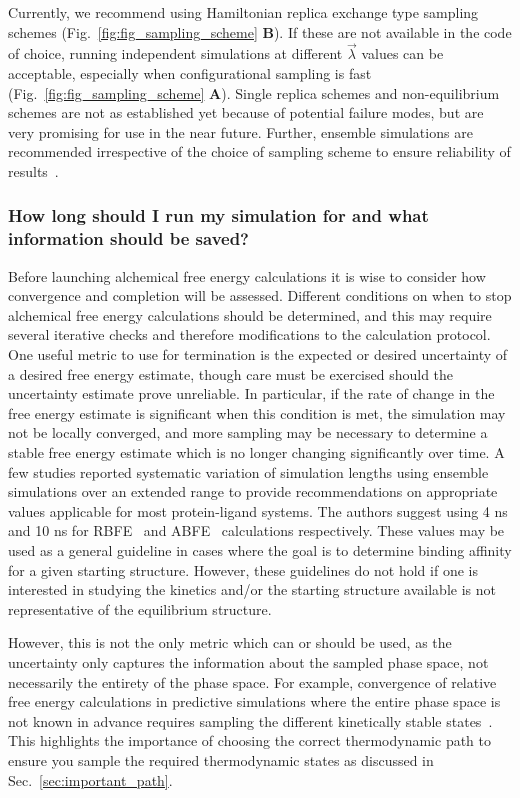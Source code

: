\documentclass[9pt,bestpractices]{livecoms}
\begin{document}
Currently, we recommend using Hamiltonian replica exchange type sampling schemes (Fig.~\ref{fig:fig_sampling_scheme} \textbf{B}). If these are not available in the code of choice, running independent simulations at different $\vec{\lambda}$ values can be acceptable, especially when configurational sampling is fast (Fig.~\ref{fig:fig_sampling_scheme} \textbf{A}). Single replica schemes and non-equilibrium schemes are not as established yet because of potential failure modes, but are very promising for use in the near future. 
Further, ensemble simulations are recommended irrespective of the choice of sampling scheme to ensure reliability of results~\cite{bhati2018, bhati2019, wan2020fep+, wade2022, wan2021uq, bhati2025, wan2023eqvsneq}.


\subsubsection{How long should I run my simulation for and what information should be saved?}
\label{sec:sim_length_information_kept}
Before launching alchemical free energy calculations it is wise to consider how convergence and completion will be assessed. Different conditions on when to stop alchemical free energy calculations should be determined, and this may require several iterative checks and therefore modifications to the calculation protocol.
One useful metric to use for termination is the expected or desired uncertainty of a desired free energy estimate, though care must be exercised should the uncertainty estimate prove unreliable.
In particular, if the rate of change in the free energy estimate is significant when this condition is met, the simulation may not be locally converged, and more sampling may be necessary to determine a stable free energy estimate which is no longer changing significantly over time. 
A few studies reported systematic variation of simulation lengths using ensemble simulations over an extended range to provide recommendations on appropriate values applicable for most protein-ligand systems. The authors suggest using 4 ns and 10 ns for RBFE~\cite{bhati2017, bhati2022, wan2023eqvsneq} and ABFE~\cite{bhati2025} calculations respectively. These values may be used as a general guideline in cases where the goal is to determine binding affinity for a given starting structure. However, these guidelines do not hold if one is interested in studying the kinetics and/or the starting structure available is not representative of the equilibrium structure.

However, this is not the only metric which can or should be used, as the uncertainty only captures the information about the sampled phase space, not necessarily the entirety of the phase space.  
For example, convergence of relative free energy calculations in predictive simulations where the entire phase space is not known in advance requires sampling the different kinetically stable states~\cite{mobley2012perspective}. 
This highlights the importance of choosing the correct thermodynamic path to ensure you sample the required thermodynamic states as discussed in Sec.~\ref{sec:important_path}.
\end{document}
